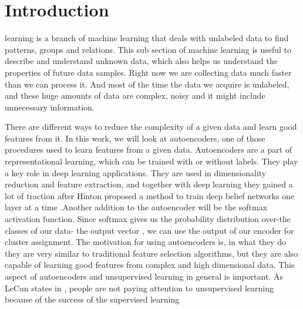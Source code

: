 \documentclass[journal]{IEEEtran}
\begin{document}
\section{Introduction}
% 
% 
% 
% 
 learning is a branch of machine learning that deals with unlabeled data to find patterns, groups
and relations. This sub section of machine learning is useful to describe and understand unknown data, which 
also helps us understand the properties of future data samples. Right now we are collecting data much faster than we can process it.
And most of the time the data we acquire is unlabeled, and these huge amounts of data are complex, noisy
and it might include unnecessary information.\par There are different ways to reduce the complexity of a given data and learn good 
features from it. In this work, we will look at autoencoders, one of those procedures used to learn features from a given data.
Autoencoders are a part of representational learning, which can be trained with or without labels.
They play a key role in deep learning applications. They are used in dimensionality reduction and feature 
extraction, and together with deep learning they gained a lot of traction after Hinton proposed a method to train 
deep belief networks one layer at a time \cite{hinton2006fast}.Another addition to the autoencoder will be the softmax activation function.
Since softmax gives us the probability distribution over-the classes of our data- the output vector \cite[pp. 178-181]{goodfellow2016deep}, we can use the output of our
encoder for cluster assignment. The motivation for using autoencoders is, in what they do they are
very similar to traditional feature selection algorithms, but they are also capable of learning good features from
complex and high dimensional data. This aspect of autoencoders and unsupervised learning in general is important. 
As LeCun states in \cite{lecun2015deep}, people are not paying attention to unsupervised learning because of the success of the supervised learning
\end{document}
